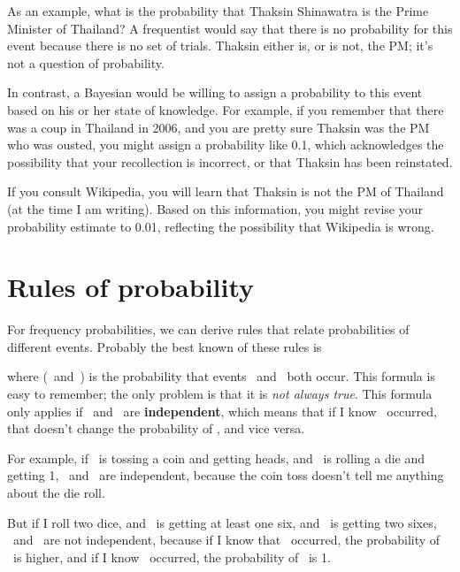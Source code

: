 \documentclass[12pt]{book}
\begin{document}
As an example, what is the probability that Thaksin Shinawatra is the
Prime Minister of Thailand?  A frequentist would say that there is no
probability for this event because there is no set of
trials.  Thaksin either is, or is not, the PM; it's not a question of
probability.

In contrast, a Bayesian would be willing to assign a probability to
this event based on his or her state of knowledge.  For example, if
you remember that there was a coup in Thailand in 2006, and you are
pretty sure Thaksin was the PM who was ousted, you might
assign a probability like 0.1, which acknowledges the possibility
that your recollection is incorrect, or that Thaksin has been
reinstated.

If you consult Wikipedia, you will learn that Thaksin is not the
PM of Thailand (at the time I am writing).  Based on this
information, you might revise your probability estimate to 0.01,
reflecting the possibility that Wikipedia is wrong.


\section{Rules of probability}

\newcommand{\AND}{~\mbox{and}~}

For frequency probabilities, we can derive rules that relate
probabilities of different events.  Probably the best known of these
rules is

\Eqn{ \Prob(\A \AND \B) = \Prob(\A) \Prob(\B) \quad Warning: not always true! }

where \Prob(\A \AND \B) is the probability that events \A~and \B~both
occur.  This formula is easy to remember; the only problem is that it
is {\em not always true}.  This formula only applies if \A~and \B~are 
{\bf independent}, which means that if I know \A~occurred, that
doesn't change the probability of \B, and vice versa.

For example, if \A~is tossing a coin and getting heads, and \B~is 
rolling a die and getting 1, \A~and \B~are independent, because
the coin toss doesn't tell me anything about the die roll.

But if I roll two dice, and \A~is getting at least one six, and
\B~is getting two sixes, \A~and \B~are not independent, because
if I know that \A~occurred, the probability of \B~is higher, and
if I know \B~occurred, the probability of \A~is 1.
\end{document}
